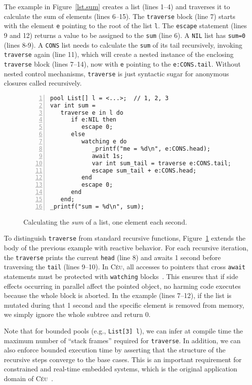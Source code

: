 \documentclass{acm_proc_article-sp}
\newcommand{\CEU}{\textsc{C\'{e}u}\xspace}
\newcommand{\code}[1] {{\small{\texttt{#1}}}}
\begin{document}
The example in Figure~\ref{lst.sum} creates a list (lines 1--4) and traverses 
it to calculate the sum of elements (lines 6--15).
The \code{traverse} block (line 7) starts with the element \code{e} pointing to 
the root of the list \code{l}.
The \code{escape} statement (lines 9 and 12) returns a value to be assigned to 
the \code{sum} (line 6).
A \code{NIL} list has \code{sum=0} (lines 8-9).
A \code{CONS} list needs to calculate the \code{sum} of its tail recursively, 
invoking \code{traverse} again (line 11), which will create a nested instance 
of the enclosing \code{traverse} block (lines 7--14), now with \code{e} 
pointing to the \code{e:CONS.tail}.
Without nested control mechanisms, \code{traverse} is just syntactic sugar for 
anonymous closures called recursively.

\begin{figure}%
\begin{lstlisting}[numbers=left,xleftmargin=3em]
pool List[] l = <...>;  // 1, 2, 3
var int sum =
   traverse e in l do
      if e:NIL then
         escape 0;
      else
         watching e do
            _printf("me = %d\n", e:CONS.head);
            await 1s;
            var int sum_tail = traverse e:CONS.tail;
            escape sum_tail + e:CONS.head;
         end
         escape 0;
      end
   end;
_printf("sum = %d\n", sum);
\end{lstlisting}
\caption{
Calculating the \emph{sum} of a list, one element each second.
\label{lst.sum.react}
}
\end{figure}

To distinguish \code{traverse} from standard recursive functions, 
Figure~\ref{lst.sum.react} extends the body of the previous example with 
reactive behavior.
For each recursive iteration, the \code{traverse} prints the current 
\code{head} (line 8) and awaits 1 second before traversing the \code{tail} 
(lines 9--10).
In \CEU, all accesses to pointers that cross \code{await} statements must be 
protected with \code{watching} blocks~\cite{ceu.mod15}.
This ensures that if side effects occurring in parallel affect the pointed 
object, no harming code executes because the whole block is aborted.
In the example (lines 7--12), if the list is mutated during that 1 second and 
the specific element is removed from memory, we simply ignore the whole subtree 
and return 0.

Note that for bounded pools (e.g., \code{List[3] l}), we can infer at compile 
time the maximum number of ``stack frames'' required for \code{traverse}.
In addition, we can also enforce bounded execution time by asserting that the 
structure of the recursive steps converge to the base cases.
This is an important requirement for constrained and real-time embedded 
systems, which is the original application domain of \CEU~\cite{ceu.sensys13}.
\end{document}
